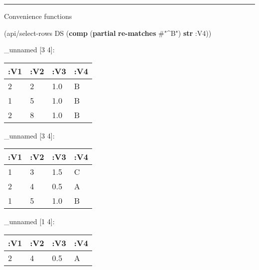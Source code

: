 \documentclass[]{article}
\newenvironment{Shaded}{\begin{snugshade}}{\end{snugshade}}
\newcommand{\AttributeTok}[1]{\textcolor[rgb]{0.77,0.63,0.00}{#1}}
\newcommand{\DecValTok}[1]{\textcolor[rgb]{0.00,0.00,0.81}{#1}}
\newcommand{\KeywordTok}[1]{\textcolor[rgb]{0.13,0.29,0.53}{\textbf{#1}}}
\newcommand{\NormalTok}[1]{#1}
\newcommand{\SpecialStringTok}[1]{\textcolor[rgb]{0.31,0.60,0.02}{#1}}
\newcommand{\VariableTok}[1]{\textcolor[rgb]{0.00,0.00,0.00}{#1}}
\begin{document}
\begin{center}\rule{0.5\linewidth}{0.5pt}\end{center}

Convenience functions

\begin{Shaded}
\begin{Highlighting}[]
\NormalTok{(api/select-rows DS (}\KeywordTok{comp}\NormalTok{ (}\KeywordTok{partial} \KeywordTok{re-matches} \SpecialStringTok{#"^B"}\NormalTok{) }\KeywordTok{str} \AttributeTok{:V4}\NormalTok{))}
\end{Highlighting}
\end{Shaded}

\_unnamed {[}3 4{]}:

\begin{longtable}[]{@{}llll@{}}
\toprule
:V1 & :V2 & :V3 & :V4\tabularnewline
\midrule
\endhead
2 & 2 & 1.0 & B\tabularnewline
1 & 5 & 1.0 & B\tabularnewline
2 & 8 & 1.0 & B\tabularnewline
\bottomrule
\end{longtable}

\begin{Shaded}
\end{Shaded}

\_unnamed {[}3 4{]}:

\begin{longtable}[]{@{}llll@{}}
\toprule
:V1 & :V2 & :V3 & :V4\tabularnewline
\midrule
\endhead
1 & 3 & 1.5 & C\tabularnewline
2 & 4 & 0.5 & A\tabularnewline
1 & 5 & 1.0 & B\tabularnewline
\bottomrule
\end{longtable}

\begin{Shaded}
\end{Shaded}

\_unnamed {[}1 4{]}:

\begin{longtable}[]{@{}llll@{}}
\toprule
:V1 & :V2 & :V3 & :V4\tabularnewline
\midrule
\endhead
2 & 4 & 0.5 & A\tabularnewline
\bottomrule
\end{longtable}
\end{document}
